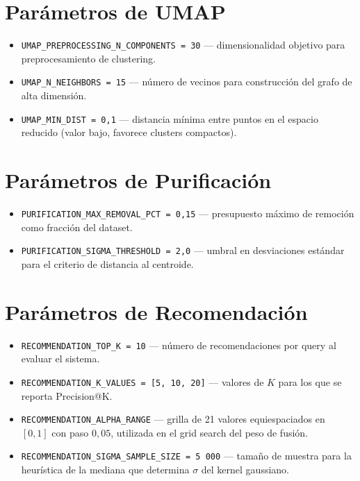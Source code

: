 \section{Parámetros de UMAP}

\begin{itemize}[leftmargin=2em]
    \item \texttt{UMAP\_PREPROCESSING\_N\_COMPONENTS = 30} --- dimensionalidad objetivo para preprocesamiento de clustering.
    \item \texttt{UMAP\_N\_NEIGHBORS = 15} --- número de vecinos para construcción del grafo de alta dimensión.
    \item \texttt{UMAP\_MIN\_DIST = 0{,}1} --- distancia mínima entre puntos en el espacio reducido (valor bajo, favorece clusters compactos).
\end{itemize}

\section{Parámetros de Purificación}

\begin{itemize}[leftmargin=2em]
    \item \texttt{PURIFICATION\_MAX\_REMOVAL\_PCT = 0{,}15} --- presupuesto máximo de remoción como fracción del dataset.
    \item \texttt{PURIFICATION\_SIGMA\_THRESHOLD = 2{,}0} --- umbral en desviaciones estándar para el criterio de distancia al centroide.
\end{itemize}

\section{Parámetros de Recomendación}

\begin{itemize}[leftmargin=2em]
    \item \texttt{RECOMMENDATION\_TOP\_K = 10} --- número de recomendaciones por query al evaluar el sistema.
    \item \texttt{RECOMMENDATION\_K\_VALUES = [5, 10, 20]} --- valores de $K$ para los que se reporta Precision@K.
    \item \texttt{RECOMMENDATION\_ALPHA\_RANGE} --- grilla de 21 valores equiespaciados en $[0, 1]$ con paso $0{,}05$, utilizada en el grid search del peso de fusión.
    \item \texttt{RECOMMENDATION\_SIGMA\_SAMPLE\_SIZE = 5\,000} --- tamaño de muestra para la heurística de la mediana que determina $\sigma$ del kernel gaussiano.
\end{itemize}

